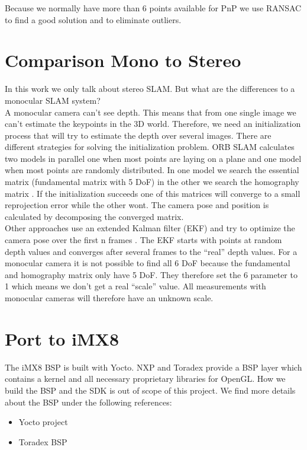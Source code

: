 \documentclass[11pt,a4paper,titlepage,oneside]{report}
\begin{document}
Because we normally have more than 6 points available for PnP we use RANSAC \cite{ransac} to find a good solution and to eliminate outliers.

\section{Comparison Mono to Stereo}\label{sec:monster}

In this work we only talk about stereo SLAM. But what are the differences to a monocular SLAM system?\\
A monocular camera can't see depth. This means that from one single image we can't estimate the keypoints in the 3D world. Therefore, we need an initialization process that will try to estimate the depth over several images. There are different strategies for solving the initialization problem. ORB SLAM calculates two models in parallel one when most points are laying on a plane and one model when most points are randomly distributed. In one model we search the essential matrix (fundamental matrix with 5 DoF) in the other we search the homography matrix \cite{orbslam}. If the initialization succeeds one of this matrices will converge to a small reprojection error while the other wont. The camera pose and position is calculated by decomposing the converged matrix.\\
Other approaches use an extended Kalman filter (EKF) and try to optimize the camera pose over the first n frames \cite{svo}. The EKF starts with points at random depth values and converges after several frames to the ``real'' depth values. For a monocular camera it is not possible to find all 6 DoF because the fundamental and homography matrix only have 5 DoF. They therefore set the 6 parameter to 1 which means we don't get a real ``scale'' value. All measurements with monocular cameras will therefore have an unknown scale.

\section{Port to iMX8}\label{sec:orbport}

The iMX8 BSP is built with Yocto. NXP and Toradex provide a BSP layer which contains a kernel and all necessary proprietary libraries for OpenGL. How we build the BSP and the SDK is out of scope of this project. We find more details about the BSP under the following references:
\begin{itemize}
	\item Yocto project \cite{yocto}
	\item Toradex BSP \cite{toradex_bsp}
\end{itemize}
\end{document}

